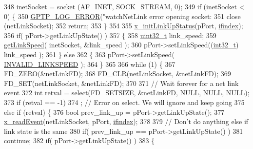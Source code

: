 \begin{DoxyCode}
348     inetSocket = socket (AF\_INET, SOCK\_STREAM, 0);
349     \textcolor{keywordflow}{if} (inetSocket < 0) \{
350         \hyperlink{gptp__log_8hpp_afefbb1009717c128012bfeed94842987}{GPTP\_LOG\_ERROR}(\textcolor{stringliteral}{"watchNetLink error opening socket: %
351         close (netLinkSocket);
352         \textcolor{keywordflow}{return};
353     \}
354 
355     \hyperlink{linux__hal__common_8cpp_a28c50a89d3f2652ec9fe1b533043a959}{x\_initLinkUpStatus}(pPort, \hyperlink{class_linux_network_interface_a01e636f8746c84f1cf3d45c4afbfde35}{ifindex});
356     \textcolor{keywordflow}{if}( pPort->getLinkUpState() )
357     \{
358         \hyperlink{parse_8c_a6eb1e68cc391dd753bc8ce896dbb8315}{uint32\_t} link\_speed;
359         \hyperlink{class_linux_network_interface_a5c60a048f947174b7a53a9a7253800b5}{getLinkSpeed}( inetSocket, &link\_speed );
360         pPort->setLinkSpeed((\hyperlink{parse_8c_a37994e3b11c72957c6f454c6ec96d43d}{int32\_t}) link\_speed );
361     \} \textcolor{keywordflow}{else}
362     \{
363         pPort->setLinkSpeed( \hyperlink{gptp__cfg_8hpp_a8b3f08c4bbdb0c6071d0c950ff4d99e5}{INVALID\_LINKSPEED} );
364     \}
365 
366     \textcolor{keywordflow}{while} (1) \{
367         FD\_ZERO(&netLinkFD);
368         FD\_CLR(netLinkSocket, &netLinkFD);
369         FD\_SET(netLinkSocket, &netLinkFD);
370 
371         \textcolor{comment}{// Wait forever for a net link event}
372         \textcolor{keywordtype}{int} retval = select(FD\_SETSIZE, &netLinkFD, \hyperlink{openavb__types__base__pub_8h_a070d2ce7b6bb7e5c05602aa8c308d0c4}{NULL}, \hyperlink{openavb__types__base__pub_8h_a070d2ce7b6bb7e5c05602aa8c308d0c4}{NULL}, \hyperlink{openavb__types__base__pub_8h_a070d2ce7b6bb7e5c05602aa8c308d0c4}{NULL});
373         \textcolor{keywordflow}{if} (retval == -1)
374             ; \textcolor{comment}{// Error on select. We will ignore and keep going}
375         \textcolor{keywordflow}{else} \textcolor{keywordflow}{if} (retval) \{
376             \textcolor{keywordtype}{bool} prev\_link\_up = pPort->getLinkUpState();
377             \hyperlink{linux__hal__common_8cpp_aa4cf76f24b5f699c50850d7c1cce3023}{x\_readEvent}(netLinkSocket, pPort, \hyperlink{class_linux_network_interface_a01e636f8746c84f1cf3d45c4afbfde35}{ifindex});
378 
379             \textcolor{comment}{// Don't do anything else if link state is the same}
380             \textcolor{keywordflow}{if}( prev\_link\_up == pPort->getLinkUpState() )
381                 \textcolor{keywordflow}{continue};
382             \textcolor{keywordflow}{if}( pPort->getLinkUpState() )
383             \{
}
\end{DoxyCode}
